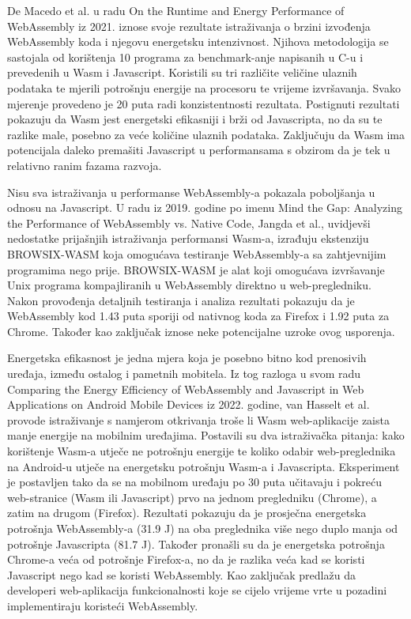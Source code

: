 \documentclass[seminarskirad]{fer}
\begin{document}
De Macedo et al. u radu On the Runtime and Energy Performance of WebAssembly iz 2021. iznose svoje rezultate istraživanja o brzini izvođenja WebAssembly koda i njegovu energetsku intenzivnost. Njihova metodologija se sastojala od korištenja 10 programa za benchmark-anje napisanih u C-u i prevedenih u Wasm i Javascript. Koristili su tri različite veličine ulaznih podataka te mjerili potrošnju energije na procesoru te vrijeme izvršavanja. Svako mjerenje provedeno je 20 puta radi konzistentnosti rezultata. Postignuti rezultati pokazuju da Wasm jest energetski efikasniji i brži od Javascripta, no da su te razlike male, posebno za veće količine ulaznih podataka. Zaključuju da Wasm ima potencijala daleko premašiti Javascript u performansama s obzirom da je tek u relativno ranim fazama razvoja.

Nisu sva istraživanja u performanse WebAssembly-a pokazala poboljšanja u odnosu na Javascript. U radu iz 2019. godine po imenu Mind the Gap: Analyzing the Performance of WebAssembly vs. Native Code, Jangda et al., uvidjevši nedostatke prijašnjih istraživanja performansi Wasm-a, izrađuju ekstenziju BROWSIX-WASM koja omogućava testiranje WebAssembly-a sa zahtjevnijim programima nego prije. BROWSIX-WASM je alat koji omogućava izvršavanje Unix programa kompajliranih u WebAssembly direktno u web-pregledniku. Nakon provođenja detaljnih testiranja i analiza rezultati pokazuju da je WebAssembly kod 1.43 puta sporiji od nativnog koda za Firefox i 1.92 puta za Chrome. Također kao zaključak iznose neke potencijalne uzroke ovog usporenja.

Energetska efikasnost je jedna mjera koja je posebno bitno kod prenosivih uređaja, između ostalog i pametnih mobitela. Iz tog razloga u svom radu Comparing the Energy Efficiency of WebAssembly and Javascript in Web Applications on Android Mobile Devices iz 2022. godine, van Hasselt et al. provode istraživanje s namjerom otkrivanja troše li Wasm web-aplikacije zaista manje energije na mobilnim uređajima. Postavili su dva istraživačka pitanja: kako korištenje Wasm-a utječe ne potrošnju energije te koliko odabir web-preglednika na Android-u utječe na energetsku potrošnju Wasm-a i Javascripta. Eksperiment je postavljen tako da se na mobilnom uređaju po 30 puta učitavaju i pokreću web-stranice (Wasm ili Javascript) prvo na jednom pregledniku (Chrome), a zatim na drugom (Firefox). Rezultati pokazuju da je prosječna energetska potrošnja WebAssembly-a (31.9 J) na oba preglednika više nego duplo manja od potrošnje Javascripta (81.7 J). Također pronašli su da je energetska potrošnja Chrome-a veća od potrošnje Firefox-a, no da je razlika veća kad se koristi Javascript nego kad se koristi WebAssembly. Kao zaključak predlažu da developeri web-aplikacija funkcionalnosti koje se cijelo vrijeme vrte u pozadini implementiraju koristeći WebAssembly.
\end{document}
